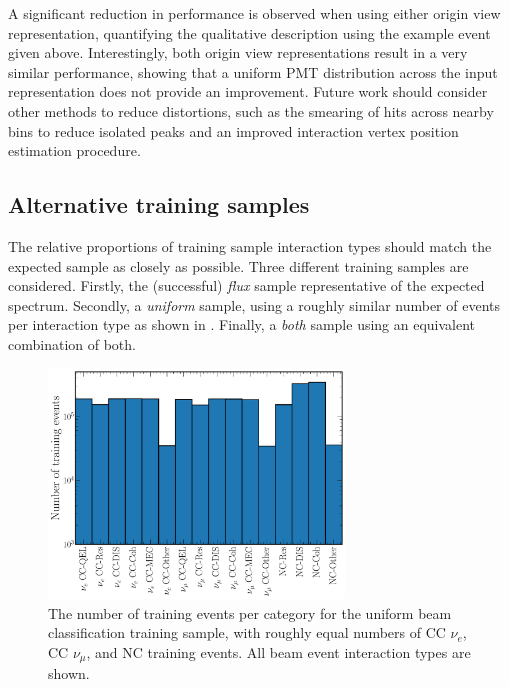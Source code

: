 A significant reduction in performance is observed when using either origin view representation,
quantifying the qualitative description using the example event given above. Interestingly, both
origin view representations result in a very similar performance, showing that a uniform PMT
distribution across the input representation does not provide an improvement. Future work should
consider other methods to reduce distortions, such as the smearing of hits across nearby bins to
reduce isolated peaks and an improved interaction vertex position estimation procedure.

\subsection{Alternative training samples} %
\label{sec:results_samples} %

The relative proportions of training sample interaction types should match the expected sample as
closely as possible. Three different training samples are considered. Firstly, the (successful)
\emph{flux} sample representative of the expected spectrum. Secondly, a \emph{uniform} sample,
using a roughly similar number of events per interaction type as shown in
. Finally, a \emph{both} sample using an equivalent
combination of both.

\begin{figure} %
    \includegraphics[width=0.7\textwidth]{diagrams/7-results/explore_uniform_training_sample.pdf}
    \caption[Number of training events per category for the uniform beam classification network
        training sample] {The number of training events per category for the uniform beam
        classification training sample, with roughly equal numbers of CC $\nu_{e}$, CC
        $\nu_{\mu}$, and NC training events. All beam event interaction types are shown.}
    \label{fig:explore_uniform_training_sample}
\end{figure}

